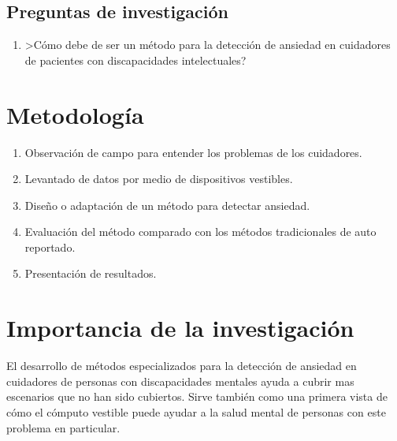 \documentclass[letterpaper,12pt]{cicese}
\begin{document}
			\section{Preguntas de investigaci\'on}
				\begin{enumerate}
					\item >C\'omo debe de ser un m\'etodo para la detecci\'on de ansiedad en cuidadores de pacientes con discapacidades intelectuales? 
				\end{enumerate}
		\chapter{Metodolog\'ia}
				\begin{enumerate}
					\item Observaci\'on de campo para entender los problemas de los cuidadores.
					\item Levantado de datos por medio de dispositivos vestibles.
					\item Dise\~no o adaptaci\'on de un m\'etodo para detectar ansiedad.
					\item Evaluaci\'on del m\'etodo comparado con los m\'etodos tradicionales de auto reportado.
					\item Presentaci\'on de resultados.
				\end{enumerate}
		\chapter{Importancia de la investigaci\'on}
				El desarrollo de m\'etodos especializados para la detecci\'on de ansiedad en cuidadores de personas con discapacidades mentales ayuda a cubrir mas escenarios que no han sido cubiertos. Sirve tambi\'en como una primera vista de c\'omo el c\'omputo vestible puede ayudar a la salud mental de  personas con este problema en particular.
\end{document}
